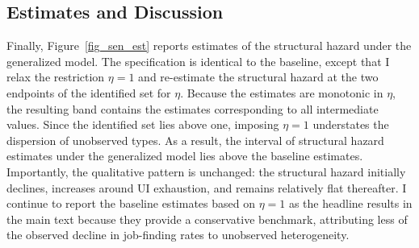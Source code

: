 \documentclass{div}
\begin{document}
\subsection{Estimates and Discussion}

Finally, Figure~\ref{fig_sen_est} reports estimates of the structural hazard under the generalized model. The specification is identical to the baseline, except that I relax the restriction $\eta=1$ and re-estimate the structural hazard at the two endpoints of the identified set for $\eta$. Because the estimates are monotonic in $\eta$, the resulting band contains the estimates corresponding to all intermediate values. Since the identified set lies above one, imposing $\eta=1$ understates the dispersion of unobserved types. As a result, the interval of structural hazard estimates under the generalized model lies above the baseline estimates. Importantly, the qualitative pattern is unchanged: the structural hazard initially declines, increases around UI exhaustion, and remains relatively flat thereafter. I continue to report the baseline estimates based on $\eta=1$ as the headline results in the main text because they provide a conservative benchmark, attributing less of the observed decline in job-finding rates to unobserved heterogeneity.



\end{document}
